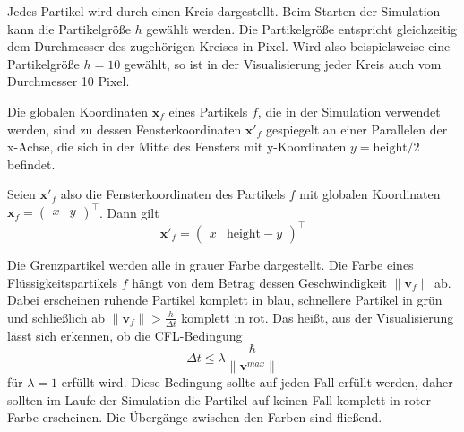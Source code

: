 \documentclass[11pt,
a4paper,
parskip=half, %
BCOR=10mm, %
english,
ngerman]{scrreprt}
\begin{document}
Jedes Partikel wird durch einen Kreis dargestellt.
Beim Starten der Simulation kann die Partikelgröße $h$ gewählt werden.
Die Partikelgröße entspricht gleichzeitig dem Durchmesser des zugehörigen Kreises in Pixel.
Wird also beispielsweise eine Partikelgröße $h = 10$ gewählt, so ist in der Visualisierung jeder Kreis auch vom Durchmesser 10 Pixel.

Die globalen Koordinaten $\textbf{x}_f$ eines Partikels $f$,
die in der Simulation verwendet werden,
sind zu dessen Fensterkoordinaten $\textbf{x}'_f$ gespiegelt an einer Parallelen der x-Achse,
die sich in der Mitte des Fensters mit y-Koordinaten $y = \text{height} / 2$ befindet.

Seien $\textbf{x}'_f$ also die Fensterkoordinaten des Partikels $f$ mit globalen Koordinaten $\textbf{x}_f = \begin{pmatrix} x & y \end{pmatrix}^\intercal$.
Dann gilt
\begin{equation}
    \textbf{x}'_f = \begin{pmatrix}
        x & \text{height} - y
    \end{pmatrix}^\intercal
\end{equation}

Die Grenzpartikel werden alle in grauer Farbe dargestellt.
Die Farbe eines Flüssigkeitspartikels $f$ hängt von dem Betrag dessen Geschwindigkeit $\| \textbf{v}_f \|$ ab.
Dabei erscheinen ruhende Partikel komplett in blau, schnellere Partikel in grün und schließlich ab $\| \textbf{v}_f \| > \frac{h}{\Delta t}$ komplett in rot.
Das heißt, aus der Visualisierung lässt sich erkennen, ob die CFL-Bedingung \begin{equation}
    \Delta t \leq \lambda \frac{\hbar}{\|\textbf{v}^{max}\| }
\end{equation}
für $\lambda = 1$ erfüllt wird.
Diese Bedingung sollte auf jeden Fall erfüllt werden, daher sollten im Laufe der Simulation die Partikel auf keinen Fall komplett in roter Farbe erscheinen.
Die Übergänge zwischen den Farben sind fließend.
\end{document}
